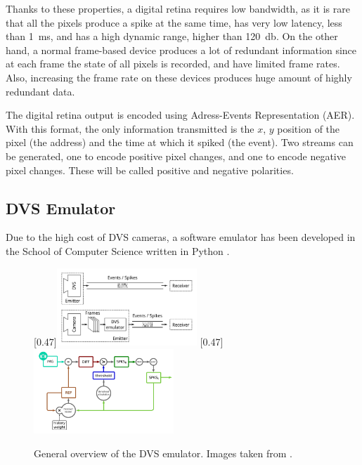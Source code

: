 Thanks to these properties, a digital retina requires low bandwidth, as it is rare that all the pixels produce a spike at the same time, has very low latency, less than \SI{1}{\milli\second}, and has a high dynamic range, higher than \SI{120}{\decibel}. On the other hand, a normal frame-based device produces a lot of redundant information since at each frame the state of all pixels is recorded, and have limited frame rates. Also, increasing the frame rate on these devices produces huge amount of highly redundant data.

The digital retina output is encoded using Adress-Events Representation (AER). With this format, the only information transmitted is the $x$, $y$ position of the pixel (the address) and the time at which it spiked (the event). Two streams can be generated, one to encode positive pixel changes, and one to encode negative pixel changes. These will be called positive and negative polarities.  


\subsection{DVS Emulator}
Due to the high cost of DVS cameras, a software emulator has been developed in the School of Computer Science written in Python \cite{Garcia2017}.

\begin{figure}[ht]
\centering
{}
  [0.47\textwidth]{\includegraphics[width=0.47\textwidth]{images/context/dvs_comparison.png}}
  [0.47\textwidth]{\includegraphics[width=0.47\textwidth]{images/context/dvs_diagram.png}}
\caption[DVS Emulator]{General overview of the DVS emulator. Images taken from \cite{Garcia2017}.}
\label{fig:dvs_emulator}
\end{figure}

